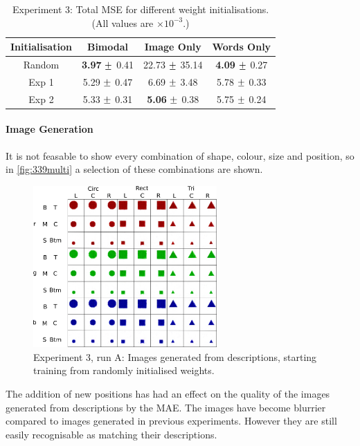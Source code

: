 \begin{table}[h!]
\centering
	\begin{tabular}{|c|c|c|c|}
	\hline
	\textbf{Initialisation} & 	\textbf{Bimodal} & \textbf{Image Only} 	& 	\textbf{Words Only} \\ \hline
	Random	&	\textbf{3.97}	$\mypm$	0.41	&	22.73	$\mypm$	35.14	&	\textbf{4.09}	$\mypm$	0.27\\ \hline
	Exp 1 	&	5.29	$\mypm$	0.47	&	6.69	$\mypm$	3.48	&	5.78	$\mypm$	0.33	\\ \hline
	Exp 2 	&	5.33	$\mypm$	0.31	&	\textbf{5.06}	$\mypm$	0.38	&	5.75	$\mypm$	0.24	\\ \hline

	\end{tabular}
\caption{Experiment 3: Total MSE for different weight initialisations. (All values are $\times10^{-3}$.)}
\label{tab:res339}
\end{table}


\paragraph{Image Generation}
It is not feasable to show every combination of shape, colour, size and position, so in \autoref{fig:339multi} a selection of these combinations are shown.

\begin{figure}[h]
\centering
\includegraphics[width=0.625\textwidth]{Figs/shapes/multiword339.png}
\caption{Experiment 3, run A: Images generated from descriptions, starting training from randomly initialised weights.}
\label{fig:339multi}
\end{figure}

The addition of new positions has had an effect on the quality of the images generated from descriptions by the \ac{MAE}. The images have become blurrier compared to images generated in previous experiments. However they are still easily recognisable as matching their descriptions.

